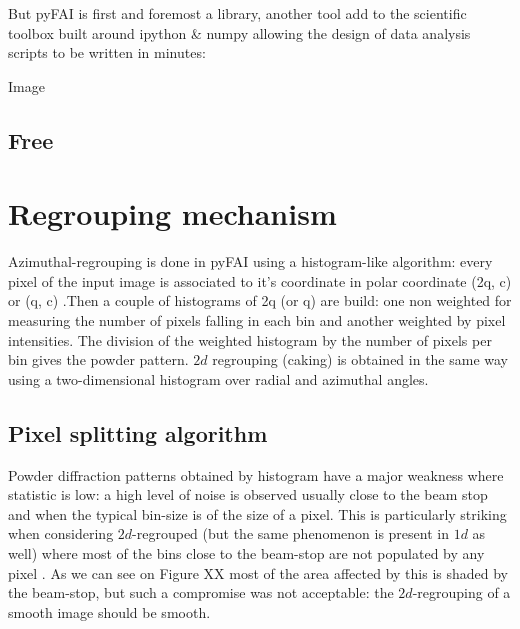 \documentclass[a4paper]{jpconf}
\begin{document}
	But pyFAI is first and foremost a library, another tool add to the scientific
	toolbox built around  ipython & numpy allowing the design of data analysis 
	scripts to be written in minutes: 
	
	Image 
	
\subsection{Free }

\section{Regrouping mechanism} 
Azimuthal-regrouping is done in pyFAI using a histogram-like algorithm: every
pixel of the input image is associated to it's coordinate in polar coordinate
(2q, c) or (q, c) .Then a couple of histograms of 2q (or q) are build: one non 
weighted for measuring the number of pixels falling in each bin and another
weighted by pixel  intensities. The division of the weighted histogram by the
number of  pixels per bin gives the powder pattern.  $2d$ regrouping (caking)  is
obtained in the same way using a two-dimensional histogram over radial and
azimuthal  angles.

\subsection{Pixel splitting algorithm}
Powder diffraction patterns obtained by histogram have a major weakness where
statistic is low: a high level of  noise is observed usually close to the beam
stop and when the typical bin-size  is of the size of a pixel. This is
particularly striking when considering  $2d$-regrouped (but the same phenomenon is
present in  $1d$ as well) where most of the bins close to the beam-stop are not
populated by  any pixel . As we can see on Figure XX most of the area affected
by this is  shaded by the beam-stop, but such a compromise was not acceptable:
the  $2d$-regrouping of a smooth image should be smooth.
\end{document}
